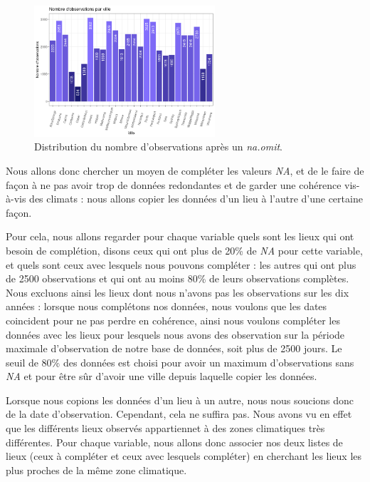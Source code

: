 \documentclass{article}
\begin{document}
\begin{figure}[H]
    \centering
    \includegraphics[width=0.6\textwidth]{Images/distribution_lieux_raw.png}
    \caption{Distribution du nombre d'observations après un \emph{na.omit}.}
    \label{fig:distrib_raw}
\end{figure}

Nous allons donc chercher un moyen de compléter les valeurs \emph{NA}, et de le faire de façon à ne pas avoir trop de données redondantes et de garder une cohérence vis-à-vis des climats : nous allons copier les données d'un lieu à l'autre d'une certaine façon.

Pour cela, nous allons regarder pour chaque variable quels sont les lieux qui ont besoin de complétion, disons ceux qui ont plus de 20\% de \emph{NA} pour cette variable, et quels sont ceux avec lesquels nous pouvons compléter : les autres qui ont plus de 2500 observations et qui ont au moins 80\% de leurs observations complètes. Nous excluons ainsi les lieux dont nous n'avons pas les observations sur les dix années : lorsque nous complétons nos données, nous voulons que les dates coincident pour ne pas perdre en cohérence, ainsi nous voulons compléter les données avec les lieux pour lesquels nous avons des observation sur la période maximale d'observation de notre base de données, soit plus de 2500 jours. Le seuil de 80\% des données est choisi pour avoir un maximum d'observations sans \emph{NA} et pour être sûr d'avoir une ville depuis laquelle copier les données.

Lorsque nous copions les données d'un lieu à un autre, nous nous soucions donc de la date d'observation. Cependant, cela ne suffira pas. Nous avons vu en effet que les différents lieux observés appartiennet à des zones climatiques très différentes. Pour chaque variable, nous allons donc associer nos deux listes de lieux (ceux à compléter et ceux avec lesquels compléter) en cherchant les lieux les plus proches de la même zone climatique.
\end{document}
